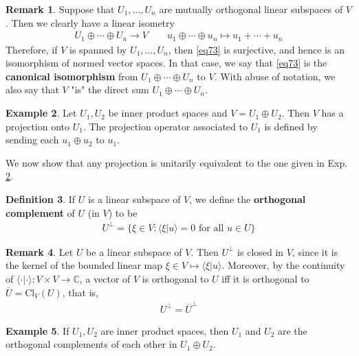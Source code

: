 \documentclass[12pt,b5paper,notitlepage]{article}
\theoremstyle{definition}
\newtheorem{df}{Definition}[subsection]
\newtheorem{eg}[df]{Example}
\newtheorem{rem}[df]{Remark}
\theoremstyle{plain}
\newcommand{\ovl}{\overline}
\newcommand{\bk}[1]{\langle {#1}\rangle}
\newcommand{\Cbb}{\mathbb C}
\newcommand{\Cl}{\mathrm{Cl}}
\numberwithin{equation}{section}
\begin{document}
\begin{rem}
Suppose that $U_1,\dots,U_n$ are mutually orthogonal linear subspaces of $V$. Then we clearly have a linear isometry
\begin{gather}\label{eq73}
U_1\oplus\cdots\oplus U_n\longrightarrow V\qquad u_1\oplus\cdots\oplus u_n\mapsto u_1+\cdots+u_n
\end{gather}
Therefore, if $V$ is spanned by $U_1,\dots,U_n$, then \eqref{eq73} is surjective, and hence is an isomorphism of normed vector spaces. In that case, we say that \eqref{eq73} is the \textbf{canonical isomorphism} from $U_1\oplus\cdots\oplus U_n$ to $V$. With abuse of notation, we also say that $V$ "is" the direct sum $U_1\oplus\cdots\oplus U_n$. 
\end{rem}


\begin{eg}\label{lb145}
Let $U_1,U_2$ be inner product spaces and $V=U_1\oplus U_2$. Then $V$ has a projection onto $U_1$. The projection operator associated to $U_1$ is defined by sending each $u_1\oplus u_2$ to $u_1$.
\end{eg}


We now show that any projection is unitarily equivalent to the one given in Exp. \ref{lb145}.

\begin{df}
If $U$ is a linear subspace of $V$, we define the \textbf{orthogonal complement}  of $U$ (in $V$) to be
\begin{align*}
U^\perp=\{\xi\in V:\bk{\xi|u}=0\text{ for all }u\in U\}
\end{align*}
\end{df}

\begin{rem}\label{lb150}
Let $U$ be a linear subspace of $V$. Then $U^\perp$ is closed in $V$, since it is the kernel of the bounded linear map $\xi\in V\mapsto\bk{\xi|u}$. Moreover, by the continuity of $\bk{\cdot|\cdot}:V\times V\rightarrow\Cbb$, a vector of $V$ is orthogonal to $U$ iff it is orthogonal to $\ovl U=\Cl_V(U)$, that is,
\begin{align*}
U^\perp=\ovl U^\perp
\end{align*}
\end{rem}



\begin{eg}
If $U_1,U_2$ are inner product spaces, then $U_1$ and $U_2$ are the orthogonal complements of each other in $U_1\oplus U_2$. 
\end{eg}
\end{document}
